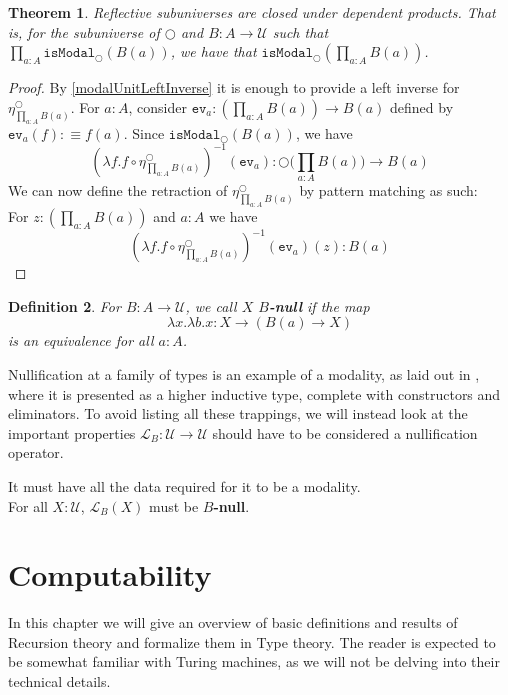 \documentclass[12pt]{report}
\newtheorem{thm}{Theorem}[section]
\newtheorem{defn}[thm]{Definition}
\begin{document}
\begin{thm}
Reflective subuniverses are closed under dependent products.
That is, for the subuniverse of $\bigcirc$ and $B : A \rightarrow \mathcal{U}$ such that\\
$\prod_{a : A}\mathtt{isModal}_{\bigcirc}(B(a))$, we have that $\mathtt{isModal}_{\bigcirc}(\prod_{a : A} B(a))$. 
\end{thm}

\begin{proof}
By \ref{modalUnitLeftInverse} it is enough to provide a left inverse for $\eta^\bigcirc_{\prod_{a : A} B(a)}$. 
For $a : A$, consider $\mathtt{ev}_a: (\prod_{a: A}B(a)) \rightarrow B(a)$ defined by $\mathtt{ev}_a (f) : \equiv f(a)$. 
Since $\mathtt{isModal}_{\bigcirc}(B(a))$, we have 
$$(\lambda f.f \circ \eta_{\prod_{a: A}B(a)}^\bigcirc)^{-1} (\mathtt{ev}_a) : \bigcirc\big(\prod_{a: A}B(a)\big) \rightarrow B(a)$$
We can now define the retraction of $\eta^\bigcirc_{\prod_{a : A} B(a)}$ by pattern matching as such:\\
For $z: (\prod_{a: A}B(a))$ and $a : A$ we have 
$$(\lambda f.f \circ \eta_{\prod_{a: A}B(a)}^\bigcirc)^{-1} (\mathtt{ev}_a) (z) : B(a)$$

\end{proof}

\begin{defn}\label{Bnull}
For $B : A \rightarrow \mathcal{U}$, we call $X$ $B$\textbf{-null} if the map 
$$\lambda x. \lambda b.x : X \rightarrow (B(a) \rightarrow X)$$
is an equivalence for all $a : A$.

\end{defn}

Nullification at a family of types is an example of a modality, as laid out in \cite{1706.07526}, where it is presented as a higher inductive type, complete with constructors and eliminators. 
To avoid listing all these trappings, we will instead look at the important properties $\mathcal{L}_B : \mathcal{U} \rightarrow \mathcal{U}$ should have to be considered a nullification operator. 

It must have all the data required for it to be a modality.\\
For all $X : \mathcal{U}$, $\mathcal{L}_B(X)$ must be $B$\textbf{-null}.

\chapter{Computability}
In this chapter we will give an overview of basic definitions and results of Recursion theory and formalize them in Type theory. 
The reader is expected to be somewhat familiar with Turing machines, as we will not be delving into their technical details. 
\end{document}
